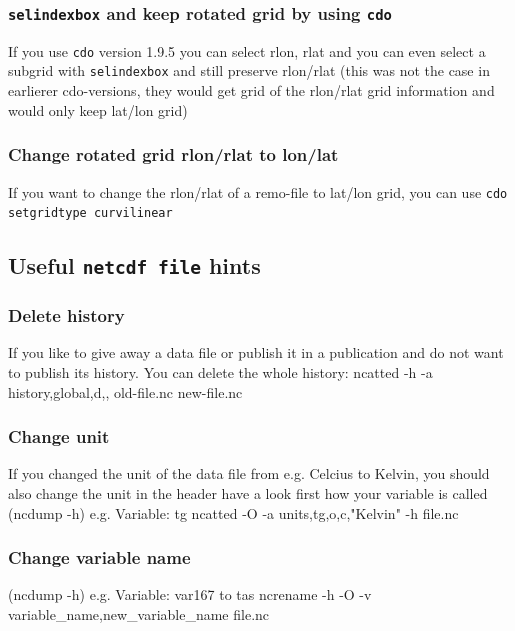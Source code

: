 \subsubsection{\texttt{selindexbox} and keep rotated grid by using \texttt{cdo}}
If you use \texttt{cdo} version 1.9.5 you can select rlon, rlat and you can even select a subgrid with \texttt{selindexbox} and still preserve rlon/rlat
(this was not the case in earlierer cdo-versions, they would get grid of the rlon/rlat grid information and would only keep lat/lon grid)

\subsubsection{Change rotated grid rlon/rlat to lon/lat}
If you want to change the rlon/rlat of a remo-file to lat/lon grid, you can use \texttt{cdo setgridtype curvilinear}

\subsection{Useful \texttt{netcdf file} hints}

\subsubsection{Delete history}
If you like to give away a data file or publish it in a publication and do not want to publish its history. 
You can delete the whole history:
ncatted -h -a history,global,d,, old-file.nc new-file.nc

\subsubsection{Change unit}
If you changed the unit of the data file from e.g. Celcius to Kelvin, you should also change the unit in the header
have a look first how your variable is called  (ncdump -h) 
e.g. Variable: tg
ncatted -O -a units,tg,o,c,"Kelvin" -h file.nc

\subsubsection{Change variable name} 
(ncdump -h) e.g. Variable: var167 to tas 
 ncrename -h -O -v variable_name,new_variable_name file.nc
